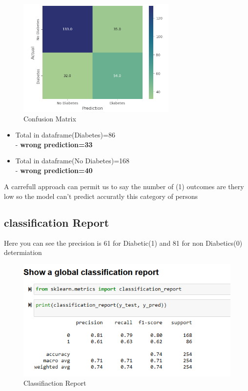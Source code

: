 

\begin{figure}[htp]
    \centering
    \includegraphics[width=0.7\textwidth]{images/confusion.png}
    \caption{Confusion Matrix }
    \label{fig:example5}
\end{figure}

\begin{itemize}
    \item Total in dataframe(Diabetes)=86\\
    - \textbf{wrong prediction=33}
    \item  Total in dataframe(No Diabetes)=168\\
    - \textbf{wrong prediction=40}
\end{itemize}
  

    
 A carrefull approach can permit us to say the number of (1) outcomes are thery 
 low so the model can't predict accuratly this category of persons 

 \newpage

 \subsection{classification Report}
 \label{sec:classification Report}

Here you can see the precision is 61 for Diabetic(1) and 81 for non Diabetics(0) determiation
\begin{figure}[htp]
    \centering
    \includegraphics[width=1.2\textwidth]{images/report.png}
    \caption{Classifiaction Report }
    \label{fig:example5}
\end{figure}

